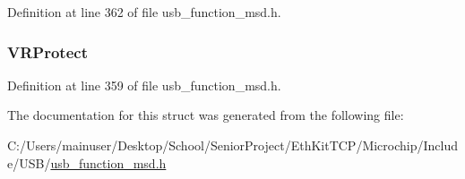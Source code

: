 Definition at line 362 of file usb\+\_\+function\+\_\+msd.\+h.

\hypertarget{struct_verify_c_b_abe3a1702e9d7f94e1dd1ff2272537e33}{}
\subsubsection[{V\+R\+Protect}]{ V\+R\+Protect}\label{struct_verify_c_b_abe3a1702e9d7f94e1dd1ff2272537e33}


Definition at line 359 of file usb\+\_\+function\+\_\+msd.\+h.



The documentation for this struct was generated from the following file\+:\begin{DoxyCompactItemize}
\item 
C\+:/\+Users/mainuser/\+Desktop/\+School/\+Senior\+Project/\+Eth\+Kit\+T\+C\+P/\+Microchip/\+Include/\+U\+S\+B/\hyperlink{usb__function__msd_8h}{usb\+\_\+function\+\_\+msd.\+h}\end{DoxyCompactItemize}
